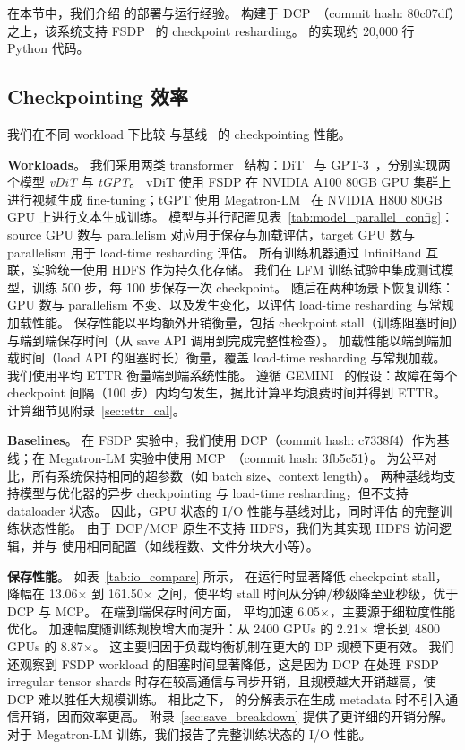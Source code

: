 在本节中，我们介绍 \sys{} 的部署与运行经验。
\sys{} 构建于 DCP~\cite{torch-dcp}（commit hash: 80c07df）之上，该系统支持 FSDP~\cite{fsdp} 的 checkpoint resharding。
\sys{} 的实现约 20,000 行 Python 代码。

\subsection{Checkpointing 效率}
\label{sec:exp_main}

我们在不同 workload 下比较 \sys{} 与基线~\cite{torch-dcp, megatron-dcp} 的 checkpointing 性能。

\noindent \textbf{Workloads}。
我们采用两类 transformer~\cite{attention} 结构：DiT~\cite{dit} 与 GPT-3~\cite{gpt3}，分别实现两个模型 \textit{vDiT} 与 \textit{tGPT}。
vDiT 使用 FSDP 在 NVIDIA A100 80GB GPU 集群上进行视频生成 fine-tuning；tGPT 使用 Megatron-LM~\cite{megatron} 在 NVIDIA H800 80GB GPU 上进行文本生成训练。
模型与并行配置见表~\ref{tab:model_parallel_config}：source GPU 数与 parallelism 对应用于保存与加载评估，target GPU 数与 parallelism 用于 load-time resharding 评估。
所有训练机器通过 InfiniBand 互联，实验统一使用 HDFS 作为持久化存储。
我们在 LFM 训练试验中集成测试模型，训练 500 步，每 100 步保存一次 checkpoint。
随后在两种场景下恢复训练：GPU 数与 parallelism 不变、以及发生变化，以评估 load-time resharding 与常规加载性能。
保存性能以平均额外开销衡量，包括 checkpoint stall（训练阻塞时间）与端到端保存时间（从 save API 调用到完成完整性检查）。
加载性能以端到端加载时间（load API 的阻塞时长）衡量，覆盖 load-time resharding 与常规加载。
我们使用平均 ETTR 衡量端到端系统性能。
遵循 GEMINI~\cite{gemini-sys} 的假设：故障在每个 checkpoint 间隔（100 步）内均匀发生，据此计算平均浪费时间并得到 ETTR。
计算细节见附录~\ref{sec:ettr_cal}。

\noindent \textbf{Baselines}。
在 FSDP 实验中，我们使用 DCP（commit hash: c7338f4）作为基线；在 Megatron-LM 实验中使用 MCP~\cite{megatron-dcp}（commit hash: 3fb5c51）。
为公平对比，所有系统保持相同的超参数（如 batch size、context length）。
两种基线均支持模型与优化器的异步 checkpointing 与 load-time resharding，但不支持 dataloader 状态。
因此，GPU 状态的 I/O 性能与基线对比，同时评估 \sys{} 的完整训练状态性能。
由于 DCP/MCP 原生不支持 HDFS，我们为其实现 HDFS 访问逻辑，并与 \sys{} 使用相同配置（如线程数、文件分块大小等）。

\noindent \textbf{保存性能}。
如表~\ref{tab:io_compare} 所示，\sys{} 在运行时显著降低 checkpoint stall，降幅在 13.06$\times$ 到 161.50$\times$ 之间，使平均 stall 时间从分钟/秒级降至亚秒级，优于 DCP 与 MCP。
在端到端保存时间方面，\sys{} 平均加速 6.05$\times$，主要源于细粒度性能优化。
加速幅度随训练规模增大而提升：从 2400 GPUs 的 2.21$\times$ 增长到 4800 GPUs 的 8.87$\times$。
这主要归因于负载均衡机制在更大的 DP 规模下更有效。
我们还观察到 FSDP workload 的阻塞时间显著降低，这是因为 DCP 在处理 FSDP irregular tensor shards 时存在较高通信与同步开销，且规模越大开销越高，使 DCP 难以胜任大规模训练。
相比之下，\sys{} 的分解表示在生成 metadata 时不引入通信开销，因而效率更高。
附录~\ref{sec:save_breakdown} 提供了更详细的开销分解。
对于 Megatron-LM 训练，我们报告了完整训练状态的 I/O 性能。

